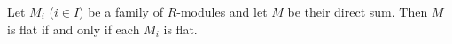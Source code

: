 Let $M_i$ ($i \in I$) be a family of $R$-modules and let $M$ be their direct
sum. Then $M$ is flat if and only if each $M_i$ is flat.
